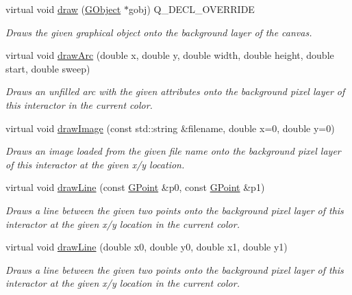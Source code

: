\begin{DoxyCompactItemize}
virtual void \mbox{\hyperlink{classGCanvas_a00bf9d87527d59e6f11756589c25e4e7}{draw}} (\mbox{\hyperlink{classGObject}{G\+Object}} $\ast$gobj) Q\+\_\+\+D\+E\+C\+L\+\_\+\+O\+V\+E\+R\+R\+I\+DE
\begin{DoxyCompactList}\small\item\em Draws the given graphical object onto the background layer of the canvas. \end{DoxyCompactList}\item 
virtual void \mbox{\hyperlink{classGDrawingSurface_a38b6fae1045191c57092b49905068144}{draw\+Arc}} (double x, double y, double width, double height, double start, double sweep)
\begin{DoxyCompactList}\small\item\em Draws an unfilled arc with the given attributes onto the background pixel layer of this interactor in the current color. \end{DoxyCompactList}\item 
virtual void \mbox{\hyperlink{classGDrawingSurface_abdd4cb1f2c64adc5d03522a1ee30febf}{draw\+Image}} (const std\+::string \&filename, double x=0, double y=0)
\begin{DoxyCompactList}\small\item\em Draws an image loaded from the given file name onto the background pixel layer of this interactor at the given x/y location. \end{DoxyCompactList}\item 
virtual void \mbox{\hyperlink{classGDrawingSurface_ae6a24b6b9a6e795d3165c1c750d5bdf1}{draw\+Line}} (const \mbox{\hyperlink{classGPoint}{G\+Point}} \&p0, const \mbox{\hyperlink{classGPoint}{G\+Point}} \&p1)
\begin{DoxyCompactList}\small\item\em Draws a line between the given two points onto the background pixel layer of this interactor at the given x/y location in the current color. \end{DoxyCompactList}\item 
virtual void \mbox{\hyperlink{classGDrawingSurface_aff299fe83178d2f3ce8c08c06b583484}{draw\+Line}} (double x0, double y0, double x1, double y1)
\begin{DoxyCompactList}\small\item\em Draws a line between the given two points onto the background pixel layer of this interactor at the given x/y location in the current color. \end{DoxyCompactList}\item 

\end{DoxyCompactItemize}
